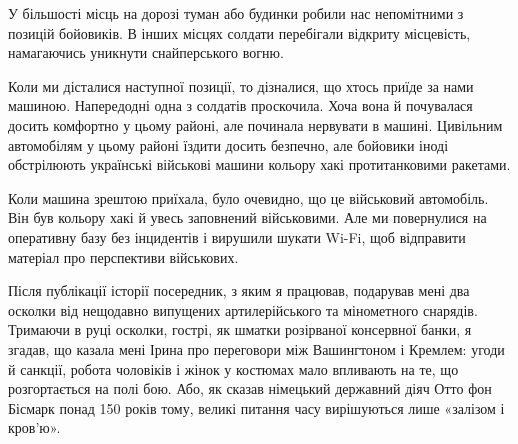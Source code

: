У більшості місць на дорозі туман або будинки робили нас непомітними з позицій
бойовиків. В інших місцях солдати перебігали відкриту місцевість, намагаючись
уникнути снайперського вогню.

Коли ми дісталися наступної позиції, то дізналися, що хтось приїде за нами
машиною. Напередодні одна з солдатів проскочила. Хоча вона й почувалася досить
комфортно у цьому районі, але починала нервувати в машині. Цивільним
автомобілям у цьому районі їздити досить безпечно, але бойовики іноді
обстрілюють українські військові машини кольору хакі протитанковими ракетами.

Коли машина зрештою приїхала, було очевидно, що це військовий автомобіль. Він
був кольору хакі й увесь заповнений військовими. Але ми повернулися на
оперативну базу без інцидентів і вирушили шукати Wi-Fi, щоб відправити матеріал
про перспективи військових.

Після публікації історії посередник, з яким я працював, подарував мені два
осколки від нещодавно випущених артилерійського та мінометного снарядів.
Тримаючи в руці осколки, гострі, як шматки розірваної консервної банки, я
згадав, що казала мені Ірина про переговори між Вашингтоном і Кремлем: угоди й
санкції, робота чоловіків і жінок у костюмах мало впливають на те, що
розгортається на полі бою. Або, як сказав німецький державний діяч Отто фон
Бісмарк понад 150 років тому, великі питання часу вирішуються лише «залізом і
кров'ю».

